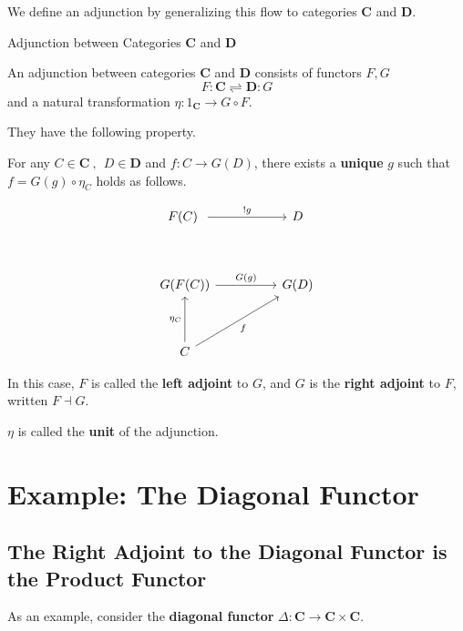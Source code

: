 \documentclass[uplatex,a4j,12pt,dvipdfmx]{jsarticle}
\begin{document}
We define an adjunction by generalizing this flow to categories $\mathbf{C}$ and $\mathbf{D}$.

\begin{itembox}[l]{Adjunction between Categories $\mathbf{C}$ and $\mathbf{D}$}

	An adjunction between categories $\mathbf{C}$ and $\mathbf{D}$ consists of functors $F, G$
	$$
		F : \mathbf{C} \rightleftharpoons \mathbf{D}: G
	$$
	and a natural transformation
	$\eta: 1_{\mathbf{C}} \to G \circ F$.

	They have the following property.

	For any
	$C \in \mathbf{C} \ , \ \ D \in \mathbf{D}$
	and
	$f: C \to G(D)$,
	there exists a \textbf{unique} $g$ such that
	$f = G(g) \circ \eta_{C}$
	holds as follows.

	\[
		\begin{tikzcd}
			F(C) \arrow[rr, "!g"] && D\\
			&&\\
			G(F(C)) \arrow[rr, "G(g)"]&& G(D) \\
			&&\\
			C \arrow[rruu, "f"'] \arrow[uu, "\eta_{C}"] &&
		\end{tikzcd}
	\]

\end{itembox}

In this case, $F$ is called the \textbf{left adjoint} to $G$, and $G$ is the \textbf{right adjoint} to $F$, written $F \dashv G$.

$\eta$ is called the \textbf{unit} of the adjunction.

\section{Example: The Diagonal Functor}

\subsection{The Right Adjoint to the Diagonal Functor is the Product Functor}

As an example, consider the \textbf{diagonal functor} $\Delta : \mathbf{C} \to \mathbf{C} \times \mathbf{C}$.
\end{document}
